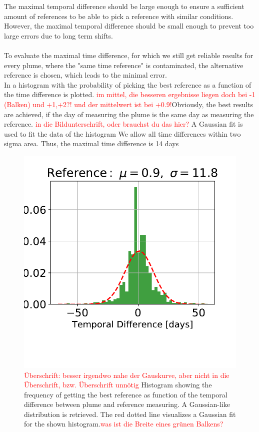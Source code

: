 The maximal temporal difference should be large enough to ensure a sufficient amount of references to be able to pick a reference with similar conditions. However, the maximal temporal difference should be small enough to prevent too large  errors due to long term shifts.\\
\\
To evaluate the maximal time difference, for which we still get reliable results for every plume, where the "same time reference" is contaminated, the alternative reference is chosen, which leads to the minimal  error.\\
%
In  a histogram with the probability of picking the best reference as a function of the time difference is plotted. \textcolor{red}{im mittel, die besseren ergebnisse liegen doch bei -1 (Balken) und +1,+2?! und der mittelwert ist bei +0.9!}Obviously, the best results are achieved, if the day of measuring the plume is the same day as measuring the reference. \textcolor{red}{in die Bildunterschrift, oder brauchst du das hier?} A Gaussian fit is used to fit the data of the histogram We allow all time differences within two sigma area. Thus, the maximal time difference is 14 days\\
\begin{figure}
	\centering
	\includegraphics[width=0.7\linewidth]{Bilder/Hist}
	\caption{\textcolor{red}{Überschrift: besser irgendwo nahe der Gauskurve, aber nicht in die Überschrift,  bzw. Überschrift unnötig} Histogram showing the frequency of getting the best reference as function of the temporal difference between plume and reference measuring. A Gaussian-like distribution is retrieved. The red dotted line visualizes a Gaussian fit for the shown histogram.\textcolor{red}{was ist die Breite eines grünen Balkens?}}
	\label{fig:Hist}
\end{figure}
